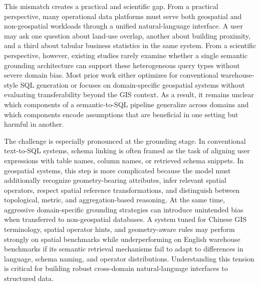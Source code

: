 \documentclass[11pt]{article}
\begin{document}
This mismatch creates a practical and scientific gap. From a practical perspective, many operational data platforms must serve both geospatial and non-geospatial workloads through a unified natural-language interface. A user may ask one question about land-use overlap, another about building proximity, and a third about tabular business statistics in the same system. From a scientific perspective, however, existing studies rarely examine whether a single semantic grounding architecture can support these heterogeneous query types without severe domain bias. Most prior work either optimizes for conventional warehouse-style SQL generation or focuses on domain-specific geospatial systems without evaluating transferability beyond the GIS context. As a result, it remains unclear which components of a semantic-to-SQL pipeline generalize across domains and which components encode assumptions that are beneficial in one setting but harmful in another.

The challenge is especially pronounced at the grounding stage. In conventional text-to-SQL systems, schema linking is often framed as the task of aligning user expressions with table names, column names, or retrieved schema snippets. In geospatial systems, this step is more complicated because the model must additionally recognize geometry-bearing attributes, infer relevant spatial operators, respect spatial reference transformations, and distinguish between topological, metric, and aggregation-based reasoning. At the same time, aggressive domain-specific grounding strategies can introduce unintended bias when transferred to non-geospatial databases. A system tuned for Chinese GIS terminology, spatial operator hints, and geometry-aware rules may perform strongly on spatial benchmarks while underperforming on English warehouse benchmarks if its semantic retrieval mechanisms fail to adapt to differences in language, schema naming, and operator distributions. Understanding this tension is critical for building robust cross-domain natural-language interfaces to structured data.
\end{document}

